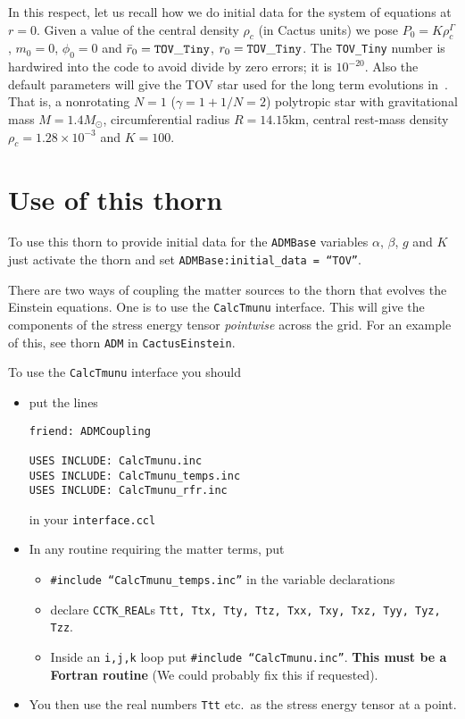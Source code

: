 In this respect, let us recall how we do initial data for the system of 
equations at $r=0$.  Given a value of the central density $\rho_c$ (in
Cactus units) we pose $P_0 = K\rho_c^{\Gamma}$, $m_0=0$, $\phi_0=0$ and 
$\bar{r}_0 = {\tt TOV\_Tiny}$, $r_0 = {\tt TOV\_Tiny}$. The {\tt TOV\_Tiny} 
number is hardwired into the code to avoid divide by zero errors; it is $10^{-20}$. 
Also the default parameters will give the TOV star used for the long term evolutions
in~\cite{Font02a}. That is, a nonrotating $N=1$ ($\gamma=1+1/N=2$) polytropic star 
with gravitational mass $M=1.4M_{\odot}$, circumferential radius $R=14.15$km, central 
rest-mass density $\rho_c=1.28 \times 10^{-3}$ and $K=100$.


\section{Use of this thorn}
\label{sec:use}

To use this thorn to provide initial data for the {\tt ADMBase}
variables $\alpha$, $\beta$, $g$ and $K$ just activate the thorn and
set {\tt ADMBase:initial\_data = ``TOV''}.

There are two ways of coupling the matter sources to the thorn that
evolves the Einstein equations. One is to use the {\tt CalcTmunu}
interface. This will give the components of the stress energy tensor
\emph{pointwise} across the grid. For an example of this, see thorn
{\tt ADM} in {\tt CactusEinstein}.

To use the {\tt CalcTmunu} interface you should
\begin{itemize}
\item put the lines
\begin{verbatim}
friend: ADMCoupling

USES INCLUDE: CalcTmunu.inc
USES INCLUDE: CalcTmunu_temps.inc
USES INCLUDE: CalcTmunu_rfr.inc
\end{verbatim}
in your {\tt interface.ccl}
\item In any routine requiring the matter terms, put 
  \begin{itemize}
  \item {\tt \#include ``CalcTmunu\_temps.inc''} in the variable
    declarations
  \item declare {\tt CCTK\_REAL}s {\tt Ttt, Ttx, Tty, Ttz, Txx, Txy,
      Txz, Tyy, Tyz, Tzz}.
  \item Inside an {\tt i,j,k} loop put {\tt \#include
      ``CalcTmunu.inc''}. {\bf This must be a Fortran routine} (We
    could probably fix this if requested).
  \end{itemize}
\item You then use the real numbers {\tt Ttt} etc.~as the stress
  energy tensor at a point.
\end{itemize}

